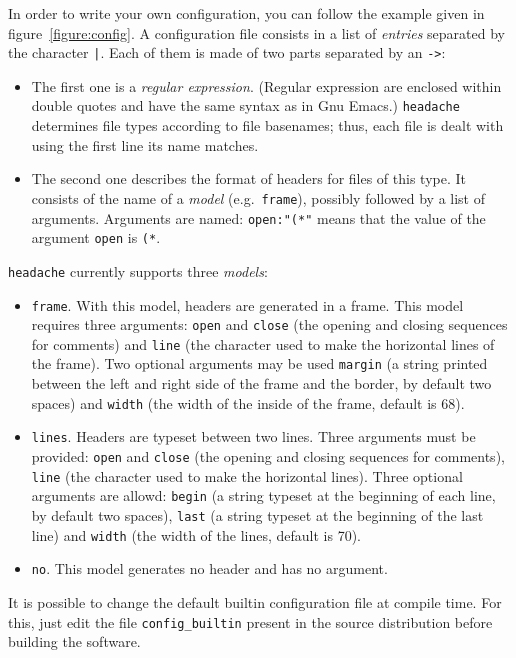\documentclass{vs-article}
\newcommand{\headache}{\texttt{headache}}
\begin{document}
In order to write your own configuration, you can follow the example
given in figure~\ref{figure:config}.  A configuration file consists in
a list of \emph{entries} separated by the character \verb+|+.  Each
of them is made of two parts separated by an \verb+->+:
\begin{itemize}
\item The first one is a \emph{regular expression}.  (Regular
  expression are enclosed within double quotes and have the same
  syntax as in Gnu Emacs.)  \headache{} determines file types according to
  file basenames; thus, each file is dealt with using the first line
  its name matches.
\item The second one describes the format of headers for files of this
  type.  It consists of the name of a \emph{model} (e.g.\ 
  \verb+frame+), possibly followed by a list of arguments.  Arguments
  are named: \verb+open:"(*"+ means that the value of the argument
  \verb+open+ is \verb+(*+.
\end{itemize}
\headache{} currently supports three \emph{models}:
\begin{itemize}
\item \verb+frame+.  With this model, headers are generated in a
  frame.  This model requires three arguments: \verb+open+ and
  \verb+close+ (the opening and closing sequences for comments) and
  \verb+line+ (the character used to make the horizontal lines of the
  frame).  Two optional arguments may be used \verb+margin+ (a string
  printed between the left and right side of the frame and the border,
  by default two spaces) and \verb+width+ (the width of the inside of
  the frame, default is 68).
\item \verb+lines+.  Headers are typeset between two lines.  Three
  arguments must be provided: \verb+open+ and \verb+close+ (the
  opening and closing sequences for comments), \verb+line+ (the
  character used to make the horizontal lines).  Three optional
  arguments are allowd: \verb+begin+ (a string typeset at the
  beginning of each line, by default two spaces), \verb+last+ (a
  string typeset at the beginning of the last line) and \verb+width+
  (the width of the lines, default is 70).
\item \verb+no+.  This model generates no header and has no argument.
\end{itemize}

It is possible to change the default builtin configuration file at
compile time.  For this, just edit the file \verb+config_builtin+
present in the source distribution before building the software.
\end{document}

